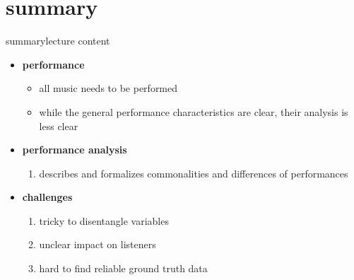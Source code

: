     \section{summary}
        \begin{frame}{summary}{lecture content}
            \begin{itemize}
                \item   \textbf{performance}
                    \begin{itemize}
                        \item   all music needs to be performed
                        \item   while the general performance characteristics are clear, their analysis is less clear
                    \end{itemize}
                \bigskip
                \item   \textbf{performance analysis}
                    \begin{enumerate}
                        \item   describes and formalizes commonalities and differences of performances
                    \end{enumerate}
                \bigskip
                \item   \textbf{challenges}
                    \begin{enumerate}
                        \item   tricky to disentangle variables
                        \item   unclear impact on listeners
                        \item   hard to find reliable ground truth data
                    \end{enumerate}
            \end{itemize}
        \end{frame}

